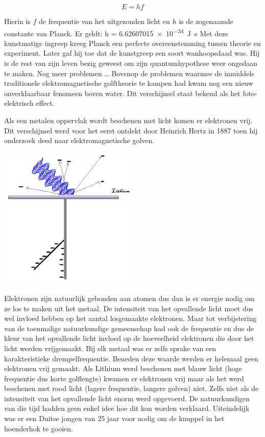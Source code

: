 \documentclass[../main.tex]{subfiles}
\begin{document}
$$E=hf$$

Hierin is $f$ de frequentie van het uitgezonden licht en $h$ is de zogenaamde constante van Planck. Er geldt: h = \SI{6.62607015e-34}{\joule\second}
Met deze kunstmatige ingreep kreeg Planck een perfecte overeenstemming tussen theorie en experiment. Later gaf hij toe dat de kunstgreep een soort wanhoopsdaad was. Hij is de rest van zijn leven bezig geweest om zijn quantumhypothese weer ongedaan te maken.
Nog meer problemen \ldots
Bovenop de problemen waarmee de inmiddels traditionele elektromagnetische golftheorie te kampen had kwam nog een nieuw onverklaarbaar fenomeen boven water. Dit verschijnsel staat bekend als het foto-elektrisch effect.

Als een metalen oppervlak wordt beschenen met licht komen er elektronen vrij. Dit verschijnsel werd voor het eerst ontdekt door Heinrich Hertz in 1887 toen hij onderzoek deed naar elektromagnetische golven. 

\begin{center}
\leavevmode
\includegraphics[width=0.5\textwidth]{./img/electroscoop.png}
\end{center}

Elektronen zijn natuurlijk gebonden aan atomen dus dan is er energie nodig om ze los te maken uit het metaal. De intensiteit van het opvallende licht moet dus wel invloed hebben op het aantal losgemaakte elektronen. Maar tot verbijstering van de toenmalige natuurkundige gemeenschap had ook de frequentie en dus de kleur van het opvallende licht invloed op de hoeveelheid elektronen die door het licht werden vrijgemaakt. Bij elk metaal was er zelfs sprake van een karakteristieke drempelfrequentie. Beneden deze waarde werden er helemaal geen elektronen vrij gemaakt. Als Lithium werd beschenen met blauw licht (hoge frequentie dus korte golflengte) kwamen er elektronen vrij maar als het werd beschenen met rood licht (lagere frequentie, langere golven) niet. Zelfs niet als de intensiteit van het opvallende licht enorm werd opgevoerd. De natuurkundigen van die tijd hadden geen enkel idee hoe dit kon worden verklaard. Uiteindelijk was er een Duitse jongen van 25 jaar voor nodig om de knuppel in het hoenderhok te gooien.
\end{document}
